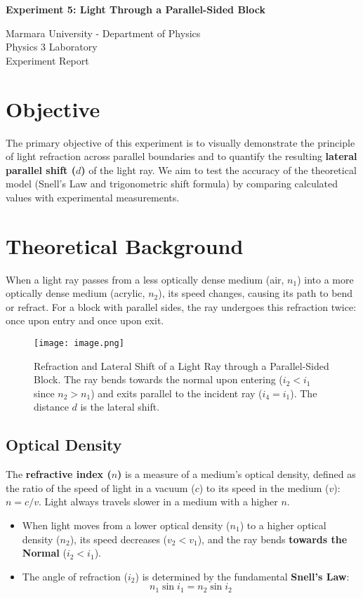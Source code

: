 \documentclass[12pt, a4paper]{article}
\begin{document}
\begin{center}
	\Large \textbf{Experiment 5: Light Through a Parallel-Sided Block}
	\vspace{0.5cm}
	
	\normalsize Marmara University - Department of Physics \\
	Physics 3 Laboratory \\
	Experiment Report
	\vspace{0.5cm}
\end{center}

\section{Objective}
The primary objective of this experiment is to visually demonstrate the principle of light refraction across parallel boundaries and to quantify the resulting \textbf{lateral parallel shift (\(d\))} of the light ray. We aim to test the accuracy of the theoretical model (Snell's Law and trigonometric shift formula) by comparing calculated values with experimental measurements.

\section{Theoretical Background}
When a light ray passes from a less optically dense medium (air, $n_1$) into a more optically dense medium (acrylic, $n_2$), its speed changes, causing its path to bend or refract. For a block with parallel sides, the ray undergoes this refraction twice: once upon entry and once upon exit.

\begin{figure}[H]
    \centering
    \texttt{[image: image.png]}
    \caption{Refraction and Lateral Shift of a Light Ray through a Parallel-Sided Block. The ray bends towards the normal upon entering ($i_2 < i_1$ since $n_2 > n_1$) and exits parallel to the incident ray ($i_4 = i_1$). The distance $d$ is the lateral shift.}
    \label{fig:ray_diagram}
\end{figure}

\subsection{Optical Density}
The \textbf{refractive index ($n$)} is a measure of a medium's optical density, defined as the ratio of the speed of light in a vacuum ($c$) to its speed in the medium ($v$): $n = c/v$. Light always travels slower in a medium with a higher $n$.
\begin{itemize}
    \item When light moves from a lower optical density ($n_1$) to a higher optical density ($n_2$), its speed decreases ($v_2 < v_1$), and the ray bends \textbf{towards the Normal} ($i_2 < i_1$).
    \item The angle of refraction ($i_2$) is determined by the fundamental \textbf{Snell's Law}: 
    $$n_1 \sin i_1 = n_2 \sin i_2$$
\end{itemize}
\end{document}
